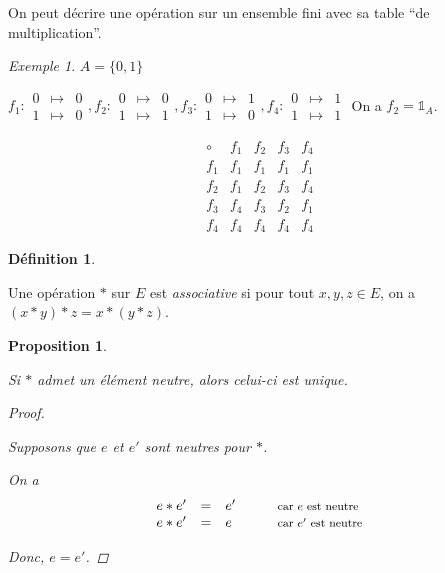 \documentclass{report}
\newcommand*{\identite}{\mathds{1}}
\newtheorem*{prop}{Proposition}
\theoremstyle{definition}
\newtheorem*{defin}{D\'efinition}
\theoremstyle{remark}
\newtheorem*{exem}{Exemple}
\begin{document}
	On peut d\'ecrire une op\'eration sur un ensemble fini avec sa table ``de multiplication''.
	\begin{exem}
		$A=\{0,1\}$

		$f_1:\begin{array}{rcl}
			0&\mapsto&0\\
			1&\mapsto&0
		\end{array},f_2:\begin{array}{rcl}
			0&\mapsto&0\\
			1&\mapsto&1
		\end{array},f_3:\begin{array}{rcl}
			0&\mapsto&1\\
			1&\mapsto&0
		\end{array},f_4:\begin{array}{rcl}
			0&\mapsto&1\\
			1&\mapsto&1
		\end{array}$
		On a $f_2=\identite_A$.

		\[
		\begin{array}{c||c|c|c|c}
			\circ&f_1&f_2&f_3&f_4\\
			\hline\hline
			f_1&f_1&f_1&f_1&f_1\\
			\hline
			f_2&f_1&f_2&f_3&f_4\\
			\hline
			f_3&f_4&f_3&f_2&f_1\\
			\hline
			f_4&f_4&f_4&f_4&f_4
		\end{array}
		\]
	\end{exem}
	\begin{defin}
		~

		Une op\'eration $*$ sur $E$ est \emph{associative} si pour tout $x,y,z \in E$, on a $(x*y)*z=x*(y*z)$.
	\end{defin}
	\begin{prop}
		~

		Si $*$ admet un \'el\'ement neutre, alors celui-ci est \emph{unique}.
		\begin{proof}~

			Supposons que $e$ et $e'$ sont neutres pour $*$.

			On a
			\[
			\begin{array}{rclll}
				e*e'&=&e'&\quad&\text{\footnotesize car $e$ est neutre}\\
				e*e'&=&e&&\text{\footnotesize car $e'$ est neutre}
			\end{array}
			\]

			Donc, $e=e'$.
		\end{proof}
	\end{prop}
\end{document}
